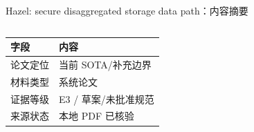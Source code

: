 \begin{frame}[t,shrink=6]{Hazel: secure disaggregated storage data path：内容摘要}
\begin{columns}[T,totalwidth=\textwidth]
\begin{column}{0.49\textwidth}
{\begin{minipage}[t]{0.97\linewidth}
\begin{minipage}{0.92\linewidth}
      \scriptsize {\tiny
\begin{tabularx}{\linewidth}{@{}YY@{}}
\toprule
\textbf{字段} & \textbf{内容} \\
\midrule
论文定位 & 当前 SOTA/补充边界 \\
材料类型 & 系统论文 \\
证据等级 & E3 / 草案/未批准规范 \\
来源状态 & 本地 PDF 已核验 \\
\bottomrule
\end{tabularx}
}
    \end{minipage}
    \vspace{1mm}
  \end{minipage}}
  \end{column}
\end{columns}
\end{frame}


